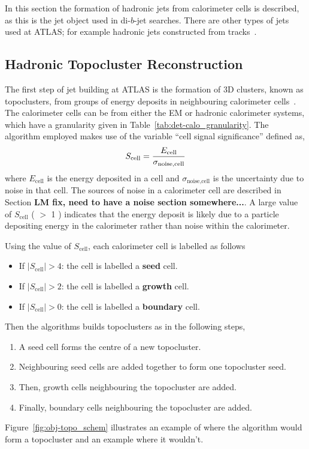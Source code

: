 In this section the formation of hadronic jets from calorimeter cells is described,
as this is the jet object used in di-$b$-jet searches.
There are other types of jets used at ATLAS; for example
hadronic jets constructed from tracks~\cite{obj-Hbb}.

\subsection{Hadronic Topocluster Reconstruction}
\label{sec:obj-jets_topo}

The first step of jet building at ATLAS is the formation of 3D clusters, known as topoclusters, from groups of energy deposits in neighbouring calorimeter cells~\cite{obj-jets_topo}.
The calorimeter cells can be from either the EM or hadronic calorimeter systems,
which have a granularity given in Table~\ref{tab:det-calo_granularity}.
The algorithm employed makes use of the variable ``cell signal significance'' defined as, 
\begin{equation}
  \Large{S_{\text{cell}} = \frac{E_{\text{cell}}}{\sigma_{\text{noise,cell}}}}
\end{equation}
where $E_{\text{cell}}$ is the energy deposited in a cell
and $\sigma_{\text{noise,cell}}$ is the uncertainty due to noise in that cell.
The sources of noise in a calorimeter cell are described in Section \textbf{LM fix, need to have a noise section somewhere...}.
A large value of $S_{\text{cell}}$ ( $>$ 1 ) indicates that the energy deposit is likely due to a particle
depositing energy in the calorimeter rather than noise within the calorimeter.

\noindent
Using the value of $S_{\text{cell}}$, each calorimeter cell is labelled as follows
\begin{itemize}
\item If $|S_{\text{cell}}| > 4$: the cell is labelled a \textbf{seed} cell.
\item If $|S_{\text{cell}}| > 2$: the cell is labelled a \textbf{growth} cell.
\item If $|S_{\text{cell}}| > 0$: the cell is labelled a \textbf{boundary} cell.
\end{itemize}
Then the algorithms builds topoclusters as in the following steps,
\begin{enumerate}
\item A seed cell forms the centre of a new topocluster.
\item Neighbouring seed cells are added together to form one topocluster seed.
\item Then, growth cells neighbouring the topocluster are added.
\item Finally, boundary cells neighbouring the topocluster are added.
\end{enumerate}
Figure~\ref{fig:obj-topo_schem} illustrates an example of where the algorithm would form a topocluster and an example where it wouldn't.

